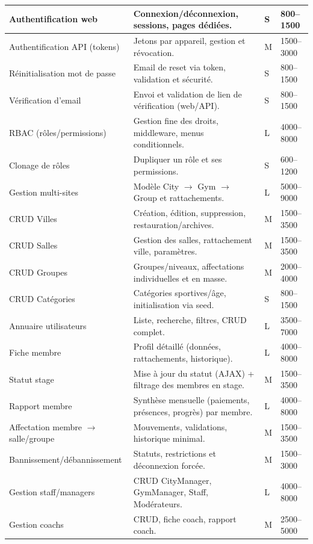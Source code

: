 \documentclass[12pt, a4paper]{article}
\begin{document}
\begin{longtable}{|p{4.2cm}|p{8.2cm}|p{1.6cm}|p{2.0cm}|}
Authentification web & Connexion/déconnexion, sessions, pages dédiées. & S & 800--1500 \\
\hline
Authentification API (tokens) & Jetons par appareil, gestion et révocation. & M & 1500--3000 \\
\hline
Réinitialisation mot de passe & Email de reset via token, validation et sécurité. & S & 800--1500 \\
\hline
Vérification d'email & Envoi et validation de lien de vérification (web/API). & S & 800--1500 \\
\hline
RBAC (rôles/permissions) & Gestion fine des droits, middleware, menus conditionnels. & L & 4000--8000 \\
\hline
Clonage de rôles & Dupliquer un rôle et ses permissions. & S & 600--1200 \\
\hline
Gestion multi-sites & Modèle City $\rightarrow$ Gym $\rightarrow$ Group et rattachements. & L & 5000--9000 \\
\hline
CRUD Villes & Création, édition, suppression, restauration/archives. & M & 1500--3500 \\
\hline
CRUD Salles & Gestion des salles, rattachement ville, paramètres. & M & 1500--3500 \\
\hline
CRUD Groupes & Groupes/niveaux, affectations individuelles et en masse. & M & 2000--4000 \\
\hline
CRUD Catégories & Catégories sportives/âge, initialisation via seed. & S & 800--1500 \\
\hline
Annuaire utilisateurs & Liste, recherche, filtres, CRUD complet. & L & 3500--7000 \\
\hline
Fiche membre & Profil détaillé (données, rattachements, historique). & L & 4000--8000 \\
\hline
Statut stage & Mise à jour du statut (AJAX) + filtrage des membres en stage. & M & 1500--3500 \\
\hline
Rapport membre & Synthèse mensuelle (paiements, présences, progrès) par membre. & L & 4000--8000 \\
\hline
Affectation membre $\rightarrow$ salle/groupe & Mouvements, validations, historique minimal. & M & 1500--3500 \\
\hline
Bannissement/débannissement & Statuts, restrictions et déconnexion forcée. & M & 1500--3000 \\
\hline
Gestion staff/managers & CRUD CityManager, GymManager, Staff, Modérateurs. & L & 4000--8000 \\
\hline
Gestion coachs & CRUD, fiche coach, rapport coach. & M & 2500--5000 \\

\end{longtable}
\end{document}
